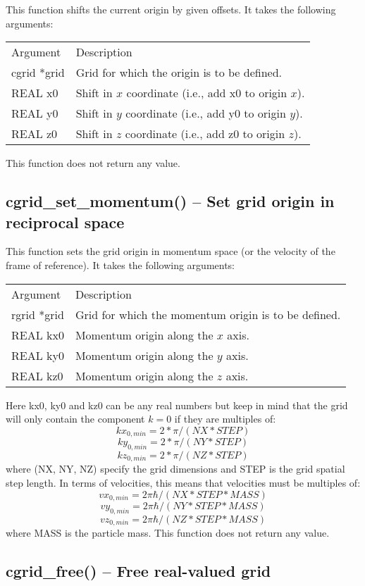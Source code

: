\documentclass[12pt,letterpaper]{report}
\begin{document}
This function shifts the current origin by given offsets. It takes the following arguments:
\begin{longtable}{p{} p{}}
Argument & Description\\
\cline{1-2}
cgrid *grid & Grid for which the origin is to be defined.\\
REAL x0 & Shift in $x$ coordinate (i.e., add x0 to origin $x$).\\
REAL y0 & Shift in $y$ coordinate (i.e., add y0 to origin $y$).\\
REAL z0 & Shift in $z$ coordinate (i.e., add z0 to origin $z$).\\
\end{longtable}
\noindent
This function does not return any value.

\subsection{cgrid\_set\_momentum() -- Set grid origin in reciprocal space}

This function sets the grid origin in momentum space (or the velocity of the frame of reference). It takes the following arguments:
\begin{longtable}{p{} p{}}
Argument & Description\\
\cline{1-2}
rgrid *grid & Grid for which the momentum origin is to be defined.\\
REAL kx0 & Momentum origin along the $x$ axis.\\
REAL ky0 & Momentum origin along the $y$ axis.\\
REAL kz0 & Momentum origin along the $z$ axis.\\
\end{longtable}
\noindent
Here kx0, ky0 and kz0 can be any real numbers but keep in mind that the grid will only contain the component $k = 0$ if they are multiples of:
$$kx_{0,min} = 2 * \pi / (NX * STEP)$$
$$ky_{0,min} = 2 * \pi / (NY * STEP)$$
$$kz_{0,min} = 2 * \pi / (NZ * STEP)$$
\noindent
where (NX, NY, NZ) specify the grid dimensions and STEP is the grid spatial step length. In terms of velocities, this means that velocities must be multiples of:
$$vx_{0,min} = 2\pi\hbar / (NX * STEP * MASS)$$
$$vy_{0,min} = 2\pi\hbar / (NY * STEP * MASS)$$
$$vz_{0,min} = 2\pi\hbar / (NZ * STEP * MASS)$$
where MASS is the particle mass. This function does not return any value.

\subsection{cgrid\_free() -- Free real-valued grid}
\end{document}
